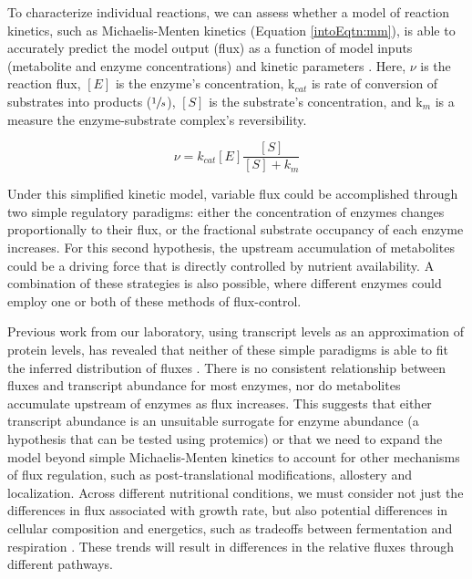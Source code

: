 To characterize individual reactions, we can assess whether a model of reaction kinetics, such as Michaelis-Menten kinetics (Equation \ref{intoEqtn:mm}), is able to accurately predict the model output (flux) as a function of model inputs (metabolite and enzyme concentrations) and kinetic parameters \cite{Anonymous:1913wn, Liebermeister:2006fm, Tummler:2014cp}. Here, $\nu$ is the reaction flux, $\left[E\right]$ is the enzyme's concentration, k$_{cat}$ is rate of conversion of substrates into products ($\sfrac{1}{s}$), $\left[S\right]$ is the substrate's concentration, and k$_{m}$ is a measure the enzyme-substrate complex's reversibility.

\begin{equation}
\nu = k_{cat}\left[E\right]\frac{\left[S\right]}{\left[S\right] + k_{m}}\label{intoEqtn:mm}
\end{equation}

Under this simplified kinetic model, variable flux could be accomplished through two simple regulatory paradigms: either the concentration of enzymes changes proportionally to their flux, or the fractional substrate occupancy of each enzyme increases. For this second hypothesis, the upstream accumulation of metabolites could be a driving force that is directly controlled by nutrient availability. A combination of these strategies is also possible, where different enzymes could employ one or both of these methods of flux-control. 

Previous work from our laboratory, using transcript levels as an approximation of protein levels, has revealed that neither of these simple paradigms is able to fit the inferred distribution of fluxes \cite{Bradley:2009fj}. There is no consistent relationship between fluxes and transcript abundance for most enzymes, nor do metabolites accumulate upstream of enzymes as flux increases. This suggests that either transcript abundance is an unsuitable surrogate for enzyme abundance (a hypothesis that can be tested using protemics) or that we need to expand the model beyond simple Michaelis-Menten kinetics to account for other mechanisms of flux regulation, such as post-translational modifications, allostery and localization. Across different nutritional conditions, we must consider not just the differences in flux associated with growth rate, but also potential differences in cellular composition and energetics, such as tradeoffs between fermentation and respiration \cite{Lange:2001th, Feist:2010hq, BARFORD:1979ei}. These trends will result in differences in the relative fluxes through different pathways.

